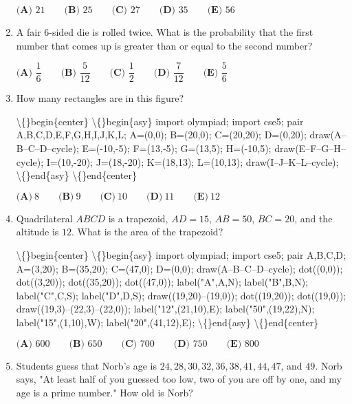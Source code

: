 \documentclass{article}
\begin{document}
\begin{enumerate}[label=\arabic*., itemsep=0.5em]
\( \textbf{(A) } 21\qquad\textbf{(B) }25\qquad\textbf{(C) }27\qquad\textbf{(D) }35\qquad\textbf{(E) }56 \)\par \vspace{0.5em}\item A fair 6-sided die is rolled twice. What is the probability that the first number that comes up is greater than or equal to the second number?

\( \textbf{(A) }\dfrac16\qquad\textbf{(B) }\dfrac5{12}\qquad\textbf{(C) }\dfrac12\qquad\textbf{(D) }\dfrac7{12}\qquad\textbf{(E) }\dfrac56 \)\par \vspace{0.5em}\item How many rectangles are in this figure?


\textbackslash\{\}begin\{center\}
\textbackslash\{\}begin\{asy\}
import olympiad;
import cse5;
pair A,B,C,D,E,F,G,H,I,J,K,L;
A=(0,0);
B=(20,0);
C=(20,20);
D=(0,20);
draw(A--B--C--D--cycle);
E=(-10,-5);
F=(13,-5);
G=(13,5);
H=(-10,5);
draw(E--F--G--H--cycle);
I=(10,-20);
J=(18,-20);
K=(18,13);
L=(10,13);
draw(I--J--K--L--cycle);
\textbackslash\{\}end\{asy\}
\textbackslash\{\}end\{center\}


\( \textbf{(A)}\ 8\qquad\textbf{(B)}\ 9\qquad\textbf{(C)}\ 10\qquad\textbf{(D)}\ 11\qquad\textbf{(E)}\ 12 \)\par \vspace{0.5em}\item Quadrilateral \(ABCD\) is a trapezoid, \(AD = 15\), \(AB = 50\), \(BC = 20\), and the altitude is \(12\). What is the area of the trapezoid?


\textbackslash\{\}begin\{center\}
\textbackslash\{\}begin\{asy\}
import olympiad;
import cse5;
pair A,B,C,D;
A=(3,20);
B=(35,20);
C=(47,0);
D=(0,0);
draw(A--B--C--D--cycle);
dot((0,0));
dot((3,20));
dot((35,20));
dot((47,0));
label("A",A,N);
label("B",B,N);
label("C",C,S);
label("D",D,S);
draw((19,20)--(19,0));
dot((19,20));
dot((19,0));
draw((19,3)--(22,3)--(22,0));
label("12",(21,10),E);
label("50",(19,22),N);
label("15",(1,10),W);
label("20",(41,12),E);
\textbackslash\{\}end\{asy\}
\textbackslash\{\}end\{center\}


\( \textbf{(A) }600\qquad\textbf{(B) }650\qquad\textbf{(C) }700\qquad\textbf{(D) }750\qquad\textbf{(E) }800 \)\par \vspace{0.5em}\item Students guess that Norb's age is \(24, 28, 30, 32, 36, 38, 41, 44, 47\), and \(49\). Norb says, "At least half of you guessed too low, two of you are off by one, and my age is a prime number." How old is Norb?


\end{enumerate}
\end{document}
